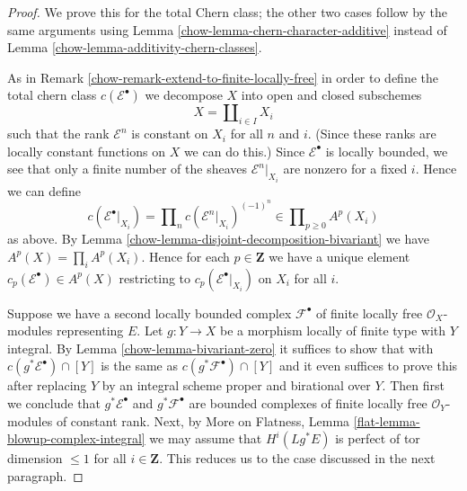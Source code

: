 \begin{proof}

We prove this for the total Chern class; the other two cases follow
by the same arguments using
Lemma \ref{chow-lemma-chern-character-additive}
instead of
Lemma \ref{chow-lemma-additivity-chern-classes}.

\medskip\noindent
As in Remark \ref{chow-remark-extend-to-finite-locally-free} in order
to define the total chern class $c(\mathcal{E}^\bullet)$
we decompose $X$ into open and closed subschemes
$$
X = \coprod\nolimits_{i \in I} X_i
$$
such that the rank $\mathcal{E}^n$ is constant on $X_i$ for
all $n$ and $i$. (Since these ranks are locally constant functions
on $X$ we can do this.) Since $\mathcal{E}^\bullet$ is locally
bounded, we see that only a finite number of the sheaves
$\mathcal{E}^n|_{X_i}$ are nonzero for a fixed $i$. Hence we
can define
$$
c(\mathcal{E}^\bullet|_{X_i}) =
\prod\nolimits_n c(\mathcal{E}^n|_{X_i})^{(-1)^n}
\in \prod\nolimits_{p \geq 0} A^p(X_i)
$$
as above. By Lemma \ref{chow-lemma-disjoint-decomposition-bivariant}
we have $A^p(X) = \prod_i A^p(X_i)$. Hence for each $p \in \mathbf{Z}$
we have a unique element $c_p(\mathcal{E}^\bullet) \in A^p(X)$ restricting
to $c_p(\mathcal{E}^\bullet|_{X_i})$ on $X_i$ for all $i$.

\medskip\noindent
Suppose we have a second locally bounded complex
$\mathcal{F}^\bullet$ of finite locally free $\mathcal{O}_X$-modules
representing $E$.
Let $g : Y \to X$ be a morphism locally of finite type with $Y$ integral.
By Lemma \ref{chow-lemma-bivariant-zero} it suffices to show that
with $c(g^*\mathcal{E}^\bullet) \cap [Y]$ is the same as
$c(g^*\mathcal{F}^\bullet) \cap [Y]$ and it even suffices to prove
this after replacing $Y$ by an integral scheme proper and birational
over $Y$. Then first we conclude that $g^*\mathcal{E}^\bullet$
and $g^*\mathcal{F}^\bullet$ are bounded complexes of finite locally
free $\mathcal{O}_Y$-modules of constant rank. Next, by
More on Flatness, Lemma \ref{flat-lemma-blowup-complex-integral}
we may assume that $H^i(Lg^*E)$ is perfect of tor dimension $\leq 1$
for all $i \in \mathbf{Z}$.
This reduces us to the case discussed in the next paragraph.


\end{proof}
